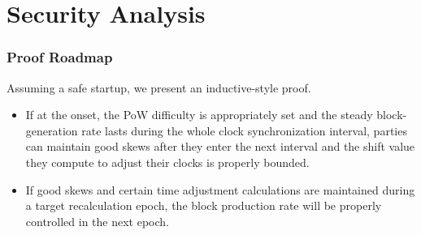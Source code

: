 \section{Security Analysis}

\begin{frame}
    \frametitle{Proof Roadmap}
    Assuming a safe startup, we present an inductive-style proof.
    \begin{itemize}
        \item If at the onset, the PoW difficulty is appropriately set and the steady block-generation rate lasts during the whole clock synchronization interval, parties can maintain good skews after they enter the next interval and the shift value they compute to adjust their clocks is properly bounded.
        \item If good skews and certain time adjustment calculations are maintained during a target recalculation epoch, the block production rate will be properly controlled in the next epoch.
    \end{itemize}

\end{frame}
